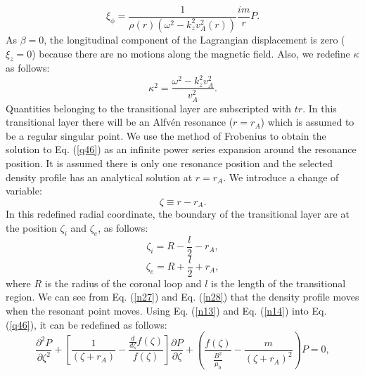 \documentclass[12pt,a4paper,twoside]{article}
\newcommand{\Alfven}{Alfv\'{e}n }
\begin{document}
\begin{equation}\label{q52}
\xi_{\phi} = \frac{1}{\rho(r)(\omega^2-k^2_z v^2_A(r))} \frac{im}{r}P .
\end{equation}
As $\beta=0$, the longitudinal component of the Lagrangian displacement is zero ($\xi_z=0$) because there are no motions along the magnetic field. Also, we redefine $\kappa$ as follows:
\begin{equation} 
\kappa^2 = \frac{\omega^2-k^2_z v^2_{A}}{v^2_{A}} .
\end{equation}
Quantities belonging to the transitional layer are subscripted with $tr$. In this transitional layer there will be an \Alfven resonance ($r=r_A$) which is assumed to be a regular singular point. We use the method of Frobenius to obtain the solution to Eq. (\ref{q46}) as an infinite power series expansion around the resonance position. It is assumed there is only one resonance position and the selected density profile has an analytical solution at $r=r_A$. We introduce a change of variable:
\begin{equation}\label{n13}
\zeta \equiv r-r_A  .
\end{equation}
In this redefined radial coordinate, the boundary of the transitional layer are at the position $\zeta_i$ and $\zeta_e$, as follows:
\begin{equation}\label{n27}
\zeta_i = R-\frac{l}{2}-r_A , 
\end{equation}
\begin{equation}\label{n28}
\zeta_e = R+\frac{l}{2}+r_A ,
\end{equation}
where $R$ is the radius of the coronal loop and $l$ is the length of the transitional region. We can see from Eq. (\ref{n27}) and Eq. (\ref{n28}) that the density profile moves when the resonant point moves. Using Eq. (\ref{n13}) and Eq. (\ref{n14}) into Eq. (\ref{q46}), it can be redefined as follows: 
\begin{equation}
\frac{\partial^2 P}{\partial \zeta^2} + \left[ \frac{1}{(\zeta + r_A)}- \frac{\frac{d}{d \zeta} f(\zeta)}{f(\zeta)} \right] \frac{\partial P}{\partial \zeta}+ \left( \frac{f(\zeta)}{\frac{B^2}{\mu_0}} - \frac{m}{(\zeta + r_A)^2}\right)P =0 ,
\end{equation}
\end{document}
